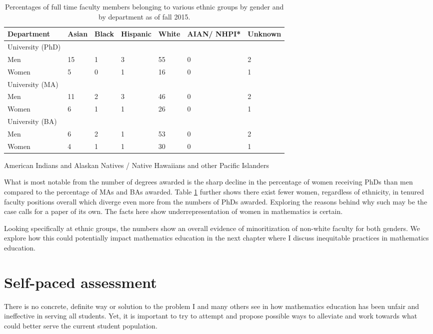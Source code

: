 \begin{table}[!htb]
  \begin{center}
    \begin{tabular}{l | l | l | l | l | p{1.2cm} | l}
      Department & Asian & Black & Hispanic & White & AIAN/ NHPI* & Unknown\\ \hline
      University (PhD)&&&&&\\
      Men & 15 & 1 & 3 & 55 & 0 & 2\\
      Women & 5 & 0 & 1 & 16 & 0 & 1\\ \hline
      University (MA)&&&&&\\
      Men & 11 & 2 & 3 & 46 & 0 & 2\\
      Women & 6 & 1 & 1 & 26 & 0 & 1\\ \hline
      University (BA)&&&&&\\
      Men & 6 & 2 & 1 & 53 & 0 & 2\\
      Women & 4 & 1 & 1 & 30 & 0 & 1
    \end{tabular}
  \end{center}
  {\footnotesize *American Indians and Alaskan Natives / Native Hawaiians and other Pacific Islanders}
  \caption{Percentages of full time faculty members belonging to various ethnic groups by gender and by department as of fall 2015.}
  \label{table:race}
\end{table}

What is most notable from the number of degrees awarded is the sharp decline in the percentage of women receiving PhDs than men compared to the percentage of MAs and BAs awarded. Table \ref{table:race} further shows there exist fewer women, regardless of ethnicity, in tenured faculty positions overall which diverge even more from the numbers of PhDs awarded. Exploring the reasons behind why such may be the case calls for a paper of its own. The facts here show underrepresentation of women in mathematics is certain.

Looking specifically at ethnic groups, the numbers show an overall evidence of minoritization of non-white faculty for both genders. We explore how this could potentially impact mathematics education in the next chapter where I discuss inequitable practices in mathematics education.

\section{Self-paced assessment}

There is no concrete, definite way or solution to the problem I and many others see in how mathematics education has been unfair and ineffective in serving all students. Yet, it is important to try to attempt and propose possible ways to alleviate and work towards what could better serve the current student population.

